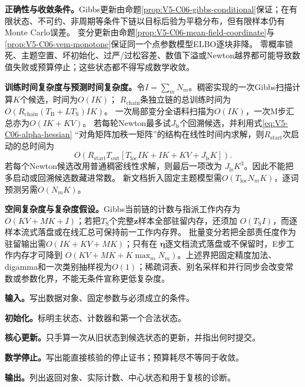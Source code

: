 \label{struct:V5-C06-CH25}
\textbf{正确性与收敛条件。}Gibbs更新由命题\ref{prop:V5-C06-gibbs-conditional}保证；在有限状态、不可约、非周期等条件下链以目标后验为平稳分布，但有限样本仍有Monte Carlo误差。
变分更新由命题\ref{prop:V5-C06-mean-field-coordinate}与
\ref{prop:V5-C06-vem-monotone}保证同一个点参数模型ELBO逐块非降。
零概率锁死、主题空置、坏初始化、过严/过松容差、数值下溢或Newton越界都可能导致数值失败或预算停止；这些状态都不得写成数学收敛。

\label{struct:V5-C06-CH26}
\textbf{训练时间复杂度与预测时间复杂度。}令$I=\sum_mN_m$。稠密实现的一次Gibbs扫描计算$K$个候选，时间为$O(IK)$；
$R_{\mathrm{chain}}$条独立链的总训练时间为
$O\!\left(R_{\mathrm{chain}}(T_{\mathrm B}+LT_{\mathrm S})IK\right)$。
一次局部变分全语料扫描为$O(IK)$，一次M步汇总亦为$O(IK+KV)$。
若每轮Newton最多试$J_{\mathrm{ls}}$个回溯候选，并利用式\eqref{eq:V5-C06-alpha-hessian}
“对角矩阵加秩一矩阵”的结构在线性时间内求解，则$R_{\mathrm{start}}$次启动的总时间为
\[
O\!\left(R_{\mathrm{start}}T_{\mathrm{out}}
\left[T_{\mathrm{loc}}IK+IK+KV+J_{\mathrm{ls}}K\right]\right).
\]
若每个Newton候选改用普通稠密线性求解，则最后一项改为
$J_{\mathrm{ls}}K^3$。因此不能把多启动或回溯候选数藏进常数。
新文档折入固定主题模型需$O(T_{\mathrm{loc}}N_mK)$，逐词预测另需$O(N_mK)$。

\label{struct:V5-C06-CH27}
\textbf{空间复杂度与复杂度假设。}Gibbs当前链的计数与指派工作内存为
$O(KV+MK+I)$；若把$T_{\mathrm S}$个完整$\boldsymbol z$样本全部驻留内存，还须加
$O(T_{\mathrm S}I)$，而逐样本流式落盘或在线汇总可保持前一工作内存界。
批量变分若把全部责任度作为驻留输出需$O(IK+KV+MK)$；只有在
$\boldsymbol\eta$逐文档流式落盘或不保留时，E步工作内存才可降到
$O(KV+MK+K\max_mN_m)$。上述界把固定精度加法、digamma和一次类别抽样视为$O(1)$；稀疏词表、别名采样和并行同步会改变常数或参数化界，不能无条件宣称更低复杂度。

\begingroup\SetAlgoLined

\begin{keypointbox}[title={LDA折叠Gibbs抽样：五步阅读}]
\textbf{输入。}写出数据对象、固定参数与必须成立的条件。\par
\textbf{初始化。}标明主状态、计数器和第一个合法状态。\par
\textbf{核心更新。}只手算一次从旧状态到候选状态的更新，并指出何时提交。\par
\textbf{数学停止。}写出能直接核验的停止证书；预算耗尽不等同于收敛。\par
\textbf{输出。}列出返回对象、实际计数、中心状态和用于复核的诊断。
\end{keypointbox}

